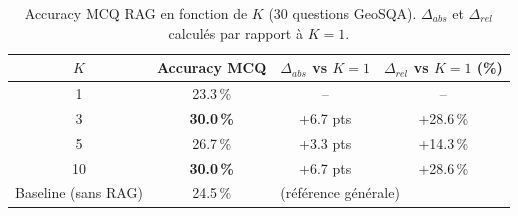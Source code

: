 \documentclass[12pt,a4paper]{article}
\begin{document}
\begin{table}[H]
\centering
\caption{Accuracy MCQ RAG en fonction de $K$ (30 questions GeoSQA).
  $\Delta_{abs}$ et $\Delta_{rel}$ calculés par rapport à $K=1$.}
\label{tab:impact_k}
\begin{tabular}{@{} c c c c @{}}
\toprule
\textbf{$K$} & \textbf{Accuracy MCQ}
  & \textbf{$\Delta_{abs}$ vs $K=1$}
  & \textbf{$\Delta_{rel}$ vs $K=1$ (\%)} \\
\midrule
1  & 23.3\,\% & --               & --         \\
3  & \textbf{30.0\,\%}
   & \textcolor{green!60!black}{+6.7 pts}
   & \textcolor{green!60!black}{+28.6\,\%}  \\
5  & 26.7\,\%
   & \textcolor{green!60!black}{+3.3 pts}
   & \textcolor{green!60!black}{+14.3\,\%}  \\
10 & \textbf{30.0\,\%}
   & \textcolor{green!60!black}{+6.7 pts}
   & \textcolor{green!60!black}{+28.6\,\%}  \\
\midrule
Baseline (sans RAG) & 24.5\,\% & \multicolumn{2}{l}{(référence générale)} \\
\bottomrule
\end{tabular}
\end{table}
\end{document}
